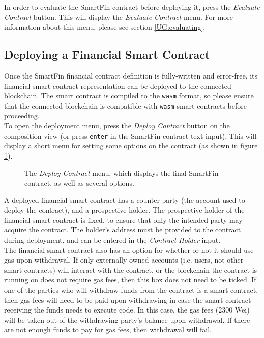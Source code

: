 In order to evaluate the SmartFin contract before deploying it, press the \textit{Evaluate Contract} button. This will display the \textit{Evaluate Contract} menu. For more information about this menu, please see section \ref{UG:evaluating}.


\subsection{Deploying a Financial Smart Contract}

Once the SmartFin financial contract definition is fully-written and error-free, its financial smart contract representation can be deployed to the connected blockchain. The smart contract is compiled to the \texttt{wasm} format, so please ensure that the connected blockchain is compatible with \texttt{wasm} smart contracts before proceeding. \\

To open the deployment menu, press the \textit{Deploy Contract} button on the composition view (or press \texttt{enter} in the SmartFin contract text input). This will display a short menu for setting some options on the contract (as shown in figure \ref{UG:fig:deploy}).

\begin{figure}[h]
    \centering
    \caption{The \textit{Deploy Contract} menu, which displays the final SmartFin contract, as well as several options.}
    \label{UG:fig:deploy}
\end{figure}

A deployed financial smart contract has a counter-party (the account used to deploy the contract), and a prospective holder. The prospective holder of the financial smart contract is fixed, to ensure that only the intended party may acquire the contract. The holder's address must be provided to the contract during deployment, and can be entered in the \textit{Contract Holder} input. \\

The financial smart contract also has an option for whether or not it should use gas upon withdrawal. If only externally-owned accounts (i.e. users, not other smart contracts) will interact with the contract, or the blockchain the contract is running on does not require gas fees, then this box does not need to be ticked. If one of the parties who will withdraw funds from the contract is a smart contract, then gas fees will need to be paid upon withdrawing in case the smart contract receiving the funds needs to execute code. In this case, the gas fees (2300 Wei) will be taken out of the withdrawing party's balance upon withdrawal. If there are not enough funds to pay for gas fees, then withdrawal will fail. \\

